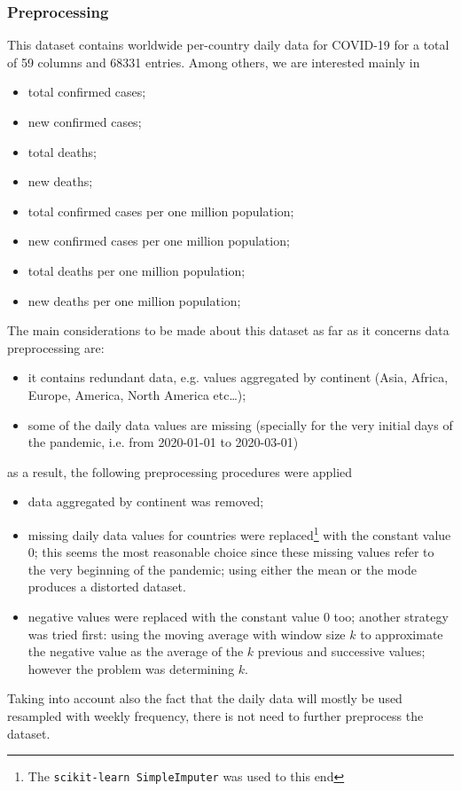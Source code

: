 \documentclass[11pt,a4paper]{article}
\begin{document}
\subsubsection{Preprocessing}
This dataset contains worldwide per-country daily data for COVID-19 for a total
of 59 columns and 68331 entries. Among others, we are interested mainly in
\begin{itemize}
    \item total confirmed cases;
    \item new confirmed cases;
    \item total deaths;
    \item new deaths;
    \item total confirmed cases per one million population;
    \item new confirmed cases per one million population;
    \item total deaths per one million population;
    \item new deaths per one million population;
\end{itemize}
The main considerations to be made about this dataset as far as it concerns data
preprocessing are:
\begin{itemize}
    \item it contains redundant data, e.g. values aggregated by continent (Asia,
    Africa, Europe, America, North America etc\dots);
    \item some of the daily data values are missing (specially for the very
    initial days of the pandemic, i.e. from 2020-01-01 to 2020-03-01)
\end{itemize}
as a result, the following preprocessing procedures were applied
\begin{itemize}
    \item data aggregated by continent was removed;
    \item missing daily data values for countries were replaced\footnote{The
    \texttt{scikit-learn SimpleImputer} was used to this end} with the constant
    value $0$; this seems the most reasonable choice since these missing values
    refer to the very beginning of the pandemic; using either the mean or the
    mode produces a distorted dataset.
    \item negative values were replaced with the constant value $0$ too; another
    strategy was tried first: using the moving average with window size $k$ to
    approximate the negative value as the average of the $k$ previous and
    successive values; however the problem was determining $k$.
\end{itemize}
Taking into account also the fact that the daily data will mostly be used
resampled with weekly frequency, there is not need to further preprocess the
dataset.
\end{document}
